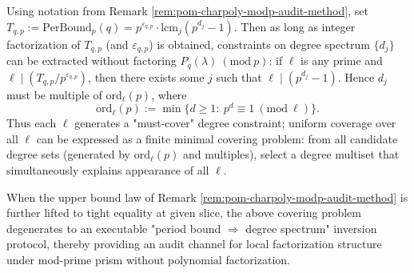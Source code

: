 \begin{remark}\label{rem:pom-charpoly-modp-degree-inversion}
Using notation from Remark \ref{rem:pom-charpoly-modp-audit-method}, set
\(
T_{q,p}:=\mathrm{PerBound}_p(q)=p^{\varepsilon_{q,p}}\cdot \mathrm{lcm}_j(p^{d_j}-1)
\).
Then as long as integer factorization of \(T_{q,p}\) (and \(\varepsilon_{q,p}\)) is obtained, constraints on degree spectrum \(\{d_j\}\) can be extracted without factoring \(P_q(\lambda)\ (\mathrm{mod}\ p)\):
if \(\ell\) is any prime and
\(
\ell\mid (T_{q,p}/p^{\varepsilon_{q,p}})
\),
then there exists some \(j\) such that
\(
\ell\mid (p^{d_j}-1)
\).
Hence \(d_j\) must be multiple of \(\mathrm{ord}_\ell(p)\), where
\[
\mathrm{ord}_\ell(p):=\min\{d\ge 1:\ p^d\equiv 1\ (\mathrm{mod}\ \ell)\}.
\]
Thus each \(\ell\) generates a "must-cover" degree constraint; uniform coverage over all \(\ell\) can be expressed as a finite minimal covering problem: from all candidate degree sets (generated by \(\mathrm{ord}_\ell(p)\) and multiples), select a degree multiset that simultaneously explains appearance of all \(\ell\).
\par
When the upper bound law of Remark \ref{rem:pom-charpoly-modp-audit-method} is further lifted to tight equality at given slice, the above covering problem degenerates to an executable "period bound \(\Rightarrow\) degree spectrum" inversion protocol, thereby providing an audit channel for local factorization structure under mod-prime prism without polynomial factorization.
\end{remark}

